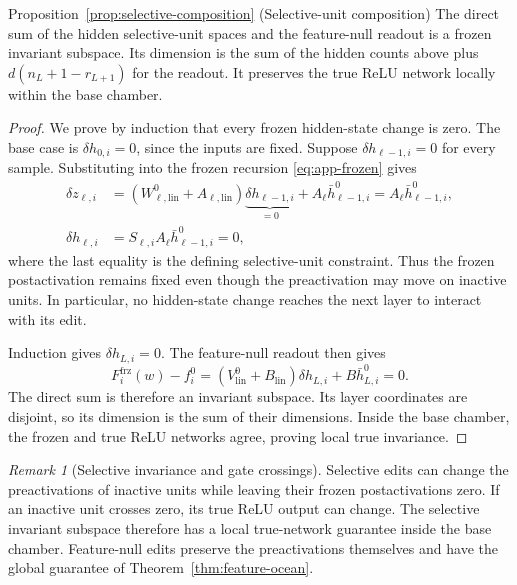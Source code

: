 \documentclass[twoside]{article}
\theoremstyle{remark}
\newtheorem{remark}[theorem]{Remark}
\newcommand{\frz}{\mathrm{frz}}
\theoremstyle{highlightdefinition}
\theoremstyle{remark}
\begin{document}
\begin{restated}{Proposition~\ref{prop:selective-composition} (Selective-unit composition)}
The direct sum of the hidden selective-unit spaces and the feature-null readout is a frozen invariant subspace. Its dimension is the sum of the hidden counts above plus $d(n_L+1-r_{L+1})$ for the readout. It preserves the true ReLU network locally within the base chamber.
\end{restated}
\begin{proof}
We prove by induction that every frozen hidden-state change is zero. The base case is $\delta h_{0,i}=0$, since the inputs are fixed. Suppose $\delta h_{\ell-1,i}=0$ for every sample. Substituting into the frozen recursion \eqref{eq:app-frozen} gives
\begin{align*}
 \delta z_{\ell,i}
 &=(W_{\ell,\mathrm{lin}}^0+A_{\ell,\mathrm{lin}})\underbrace{\delta h_{\ell-1,i}}_{=0}
   +A_\ell\bar h_{\ell-1,i}^0
   =A_\ell\bar h_{\ell-1,i}^0,\\
 \delta h_{\ell,i}
 &=S_{\ell,i}A_\ell\bar h_{\ell-1,i}^0=0,
\end{align*}
where the last equality is the defining selective-unit constraint. Thus the frozen postactivation remains fixed even though the preactivation may move on inactive units. In particular, no hidden-state change reaches the next layer to interact with its edit.

Induction gives $\delta h_{L,i}=0$. The feature-null readout then gives
\[
 F_i^{\frz}(w)-f_i^0
 =(V_{\mathrm{lin}}^0+B_{\mathrm{lin}})\delta h_{L,i}
   +B\bar h_{L,i}^0=0.
\]
The direct sum is therefore an invariant subspace. Its layer coordinates are disjoint, so its dimension is the sum of their dimensions. Inside the base chamber, the frozen and true ReLU networks agree, proving local true invariance.
\end{proof}

\begin{remark}[Selective invariance and gate crossings]
Selective edits can change the preactivations of inactive units while leaving their frozen postactivations zero. If an inactive unit crosses zero, its true ReLU output can change. The selective invariant subspace therefore has a local true-network guarantee inside the base chamber. Feature-null edits preserve the preactivations themselves and have the global guarantee of Theorem~\ref{thm:feature-ocean}.
\end{remark}
\end{document}
